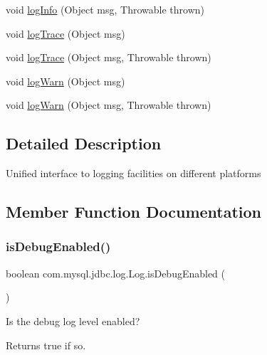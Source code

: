\begin{DoxyCompactItemize}
void \mbox{\hyperlink{interfacecom_1_1mysql_1_1jdbc_1_1log_1_1_log_a577190d2919e07471dcd29d57eebee30}{log\+Info}} (Object msg, Throwable thrown)
\item 
void \mbox{\hyperlink{interfacecom_1_1mysql_1_1jdbc_1_1log_1_1_log_a8946382e4cf99819a43cdb3783fd0ee3}{log\+Trace}} (Object msg)
\item 
void \mbox{\hyperlink{interfacecom_1_1mysql_1_1jdbc_1_1log_1_1_log_a99ab17ccd9795acda736a284d9e32024}{log\+Trace}} (Object msg, Throwable thrown)
\item 
void \mbox{\hyperlink{interfacecom_1_1mysql_1_1jdbc_1_1log_1_1_log_aa37a430b8cd7d66bb3ff46cb87e060f3}{log\+Warn}} (Object msg)
\item 
void \mbox{\hyperlink{interfacecom_1_1mysql_1_1jdbc_1_1log_1_1_log_a04d875e95d9a1d35f305da5ca20219a3}{log\+Warn}} (Object msg, Throwable thrown)
\end{DoxyCompactItemize}


\subsection{Detailed Description}
Unified interface to logging facilities on different platforms 

\subsection{Member Function Documentation}
\mbox{\label{interfacecom_1_1mysql_1_1jdbc_1_1log_1_1_log_a2e59f38e2359e90879c658cfb2f4e518}} 
\subsubsection{\texorpdfstring{is\+Debug\+Enabled()}{isDebugEnabled()}}
{\footnotesize\ttfamily boolean com.\+mysql.\+jdbc.\+log.\+Log.\+is\+Debug\+Enabled (\begin{DoxyParamCaption}{ }\end{DoxyParamCaption})}

Is the \textquotesingle{}debug\textquotesingle{} log level enabled?

\begin{DoxyReturn}{Returns}
true if so. 
\end{DoxyReturn}


